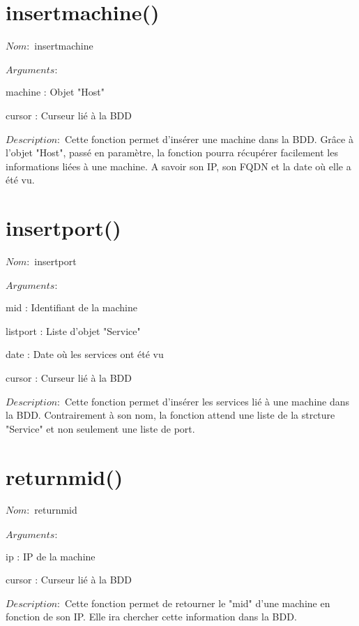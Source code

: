 \documentclass[12pt]{report}
\begin{document}
		\section{insertmachine()}
			{\setlength{\parindent}{0cm}
			$Nom :$ insertmachine\\\\
			}
			$Arguments :$
			\begin{description}
				\item machine : Objet "Host"
				\item cursor : Curseur lié à la BDD\\
			\end{description}
			$Description : $ Cette fonction permet d'insérer une machine dans la BDD. Grâce à l'objet "Host", passé en paramètre, la fonction pourra récupérer facilement les informations liées à une machine. A savoir son IP, son FQDN et la date où elle a été vu.
		\section{insertport()}
			{\setlength{\parindent}{0cm}
			$Nom :$ insertport\\\\
			}
			$Arguments :$
			\begin{description}
				\item mid : Identifiant de la machine
				\item listport : Liste d'objet "Service"
				\item date : Date où les services ont été vu
				\item cursor : Curseur lié à la BDD\\
			\end{description}
			$Description : $ Cette fonction permet d'insérer les services lié à une machine dans la BDD. Contrairement à son nom, la fonction attend une liste de la strcture "Service" et non seulement une liste de port.
		\section{returnmid()}
			{\setlength{\parindent}{0cm}
			$Nom :$ returnmid\\\\
			}
			$Arguments :$
			\begin{description}
				\item ip : IP de la machine
				\item cursor : Curseur lié à la BDD\\
			\end{description}
			$Description : $ Cette fonction permet de retourner le "mid" d'une machine en fonction de son IP. Elle ira chercher cette information dans la BDD.
\end{document}

